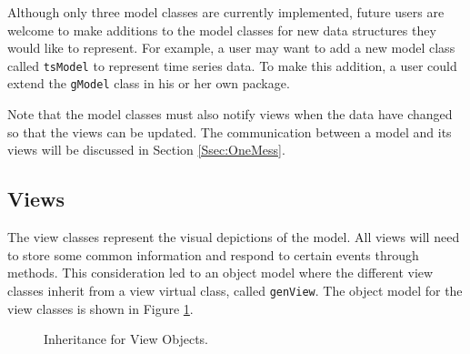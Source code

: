 \documentclass{article}[11pt]
\newcommand{\Robject}[1]{{\texttt{#1}}}
\begin{document}
Although only three model classes are currently implemented, future users are
welcome to make additions to the model classes for new data structures they
would like to represent.  For example, a user may want to add a new model
class called \Robject{tsModel} to represent time series data.  To make this
addition, a user could extend the \Robject{gModel} class in his or her own
package. 

Note that the model classes must also notify views when the data have changed
so that the views can be updated.  The communication between a model and its
views will be discussed in Section \ref{Ssec:OneMess}. 

\subsection{Views}\label{Ssec:OneViews}

The view classes represent the visual depictions of the model.  All views will
need to store some common information and respond to certain events through
methods.  This consideration led to an object model where the different view
classes inherit from a view virtual class, called \Robject{genView}.  The
object model for the view classes is shown in Figure \ref{Fig:View}.

\begin{figure}[ht]
  \begin{center}
    \caption{ Inheritance for View Objects. }
    \label{Fig:View}
  \end{center}
\end{figure}
\end{document}
